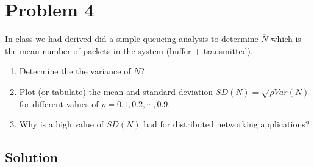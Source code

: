 
\section*{Problem 4}

In class we had derived did a simple queueing analysis to determine $\overline{N}$ which is the mean number of packets
in the system (buffer + transmitted).

\begin{enumerate}
    \item Determine the the variance of $N$?
    \item Plot (or tabulate) the mean and standard deviation $SD(N) = \sqrt{\rho V ar(N)}$ for different values of $\rho = 0.1, 0.2, \cdots , 0.9$.
    \item Why is a high value of $SD(N)$ bad for distributed networking applications?
\end{enumerate}

\subsection*{Solution}
